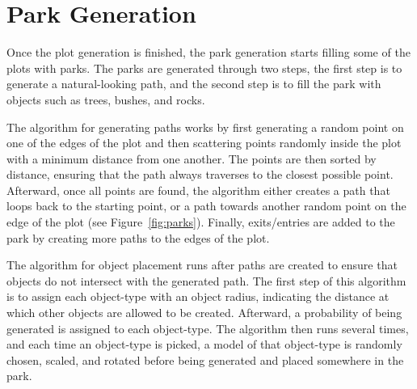 \section{Park Generation}

Once the plot generation is finished, the park generation starts filling some of the plots with parks.
The parks are generated through two steps, the first step is to generate a natural-looking path, and the second step is to fill the park with objects such as trees, bushes, and rocks.

The algorithm for generating paths works by first generating a random point on one of the edges of the plot and then scattering points randomly inside the plot with a minimum distance from one another.
The points are then sorted by distance, ensuring that the path always traverses to the closest possible point.
Afterward, once all points are found, the algorithm either creates a path that loops back to the starting point, or a path towards another random point on the edge of the plot (see Figure~\ref{fig:parks}).
Finally, exits/entries are added to the park by creating more paths to the edges of the plot.

The algorithm for object placement runs after paths are created to ensure that objects do not intersect with the generated path.
The first step of this algorithm is to assign each object-type with an object radius, indicating the distance at which other objects are allowed to be created.
Afterward, a probability of being generated is assigned to each object-type.
The algorithm then runs several times, and each time an object-type is picked, a model of that object-type is randomly chosen, scaled, and rotated before being generated and placed somewhere in the park.

